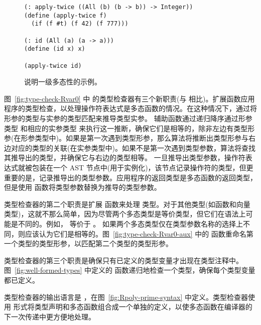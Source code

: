 \documentclass[11pt]{book}
\begin{document}
\begin{figure}[tbp]
\begin{lstlisting}
(: apply-twice ((All (b) (b -> b)) -> Integer))
(define (apply-twice f)
  (if (f #t) (f 42) (f 777)))

(: id (All (a) (a -> a)))
(define (id x) x)

(apply-twice id)
\end{lstlisting}
\caption{说明一级多态性的示例。}
\label{fig:apply-twice}
\end{figure}

图~\ref{fig:type-check-Rvar0} 中 \LangPoly{} 的类型检查器有三个新职责(与 \LangLoop{} 相比)。扩展函数应用程序的类型检查，以处理操作符表达式是多态函数的情况。在这种情况下，通过将形参的类型与实参的类型匹配来推导类型实参。
%
  辅助函数通过递归降序通过形参类型  和相应的实参类型 来执行这一推断，确保它们是相等的，除非左边有类型形参(在形参类型中)。如果是第一次遇到类型形参，那么算法将推断出类型形参与右边对应的类型的关联(在实参类型中)。如果不是第一次遇到类型参数，算法将查找其推导出的类型，并确保它与右边的类型相等。
%
一旦推导出类型参数，操作符表达式就被包装在一个  AST 节点中(用于实例化)，该节点记录操作符的类型，但更重要的是，记录推导出的类型参数。应用程序的返回类型是多态函数的返回类型，但是使用  函数将类型参数替换为推导的类型参数。

类型检查器的第二个职责是扩展  函数来处理  类型。对于其他类型(如函数和向量类型)，这就不那么简单，因为尽管两个多态类型是等价类型，但它们在语法上可能是不同的。例如，
 等价于  。
如果两个多态类型仅在类型参数名称的选择上不同，则应该认为它们是相等的。图~\ref{fig:type-check-Rvar0-aux} 中的
 函数重命名第一个类型的类型形参，以匹配第二个类型的类型形参。

类型检查器的第三个职责是确保只有已定义的类型变量才出现在类型注释中。图~\ref{fig:well-formed-types} 中定义的
 函数递归地检查一个类型，确保每个类型变量都已定义。

类型检查器的输出语言是 \LangInst{} ，在图~\ref{fig:Rpoly-prime-syntax} 中定义。类型检查器使用  形式将类型声明和多态函数组合成一个单独的定义，以使多态函数在编译器的下一次传递中更方便地处理。
\end{document}

